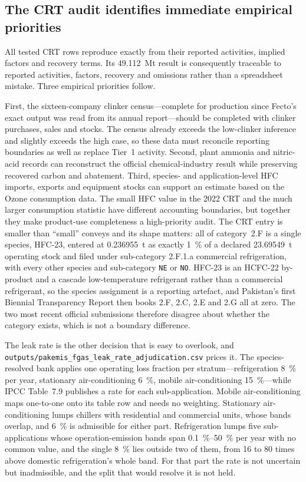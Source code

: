 \subsection{The CRT audit identifies immediate empirical priorities}

All tested CRT rows reproduce exactly from their reported activities, implied factors and
recovery terms. Its \SI{49.112}{\mega\tonne} result is consequently traceable to reported
activities, factors, recovery and omissions rather than a spreadsheet mistake. Three
empirical priorities follow.

First, the sixteen-company clinker census---complete for production since Fecto's exact
output was read from its annual report---should be completed with clinker purchases, sales
and stocks. The census already exceeds the low-clinker inference and slightly exceeds the
high case, so these data must reconcile reporting boundaries as well as replace Tier~1
activity. Second, plant ammonia and nitric-acid records can
reconstruct the official chemical-industry result while preserving recovered carbon and
abatement. Third, species- and application-level HFC imports, exports and equipment stocks can
support an estimate based on the Ozone consumption data. The small HFC value in the 2022 CRT
and the much larger consumption statistic have different accounting boundaries, but together
they make product-use completeness a high-priority audit. The CRT entry is smaller than
``small'' conveys and its shape matters: all of category~2.F is a single species, HFC-23,
entered at \SI{0.236955}{\tonne} as exactly \SI{1}{\percent} of a declared
\SI{23.69549}{\tonne} operating stock and filed under sub-category 2.F.1.a commercial
refrigeration, with every other species and sub-category \texttt{NE} or \texttt{NO}.
HFC-23 is an HCFC-22 by-product and a cascade low-temperature refrigerant rather than a
commercial refrigerant, so the species assignment is a reporting artefact, and Pakistan's
first Biennial Transparency Report then books 2.F, 2.C, 2.E and 2.G all at zero. The two
most recent official submissions therefore disagree about whether the category exists,
which is not a boundary difference.

The leak rate is the other decision that is easy to overlook, and
\texttt{outputs/pakemis\_fgas\_leak\_rate\_adjudication.csv} prices it. The
species-resolved bank applies one operating loss fraction per stratum---refrigeration
\SI{8}{\percent} per year, stationary air-conditioning \SI{6}{\percent}, mobile
air-conditioning \SI{15}{\percent}---while IPCC Table~7.9 publishes a rate for each
sub-application. Mobile air-conditioning maps one-to-one onto its table row and needs no
weighting. Stationary air-conditioning lumps chillers with residential and commercial
units, whose bands overlap, and \SI{6}{\percent} is admissible for either part.
Refrigeration lumps five sub-applications whose operation-emission bands span
\SIrange{0.1}{50}{\percent} per year with no common value, and the single
\SI{8}{\percent} lies outside two of them, from \num{16} to \num{80} times above
domestic refrigeration's whole band. For that part the rate is not uncertain but inadmissible, and
the split that would resolve it is not held.

